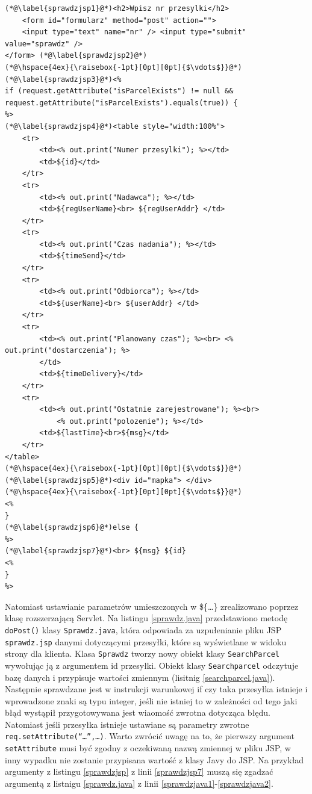 \documentclass[eng,printmode,oneside]{mgr}
\begin{document}
\begin{lstlisting}[caption=Ciało pliku JavaServlet Pages -
sprawdz.jsp,label=sprawdzjsp] 
(*@\label{sprawdzjsp1}@*)<h2>Wpisz nr przesylki</h2> 
	<form id="formularz" method="post" action=""> 
	<input type="text" name="nr" /> <input type="submit" value="sprawdz" />
</form> (*@\label{sprawdzjsp2}@*)
(*@\hspace{4ex}{\raisebox{-1pt}[0pt][0pt]{$\vdots$}}@*)
(*@\label{sprawdzjsp3}@*)<%
if (request.getAttribute("isParcelExists") != null &&
request.getAttribute("isParcelExists").equals(true)) {
%>
(*@\label{sprawdzjsp4}@*)<table style="width:100%">
	<tr>
		<td><% out.print("Numer przesylki"); %></td>
		<td>${id}</td>
	</tr>
	<tr>
		<td><% out.print("Nadawca"); %></td>
		<td>${regUserName}<br> ${regUserAddr} </td>
	</tr>
	<tr>
		<td><% out.print("Czas nadania"); %></td>
		<td>${timeSend}</td>
	</tr>
	<tr>
		<td><% out.print("Odbiorca"); %></td>
		<td>${userName}<br> ${userAddr} </td>
	</tr>
	<tr>
		<td><% out.print("Planowany czas"); %><br> <% out.print("dostarczenia"); %>
		</td>
		<td>${timeDelivery}</td>
	</tr>
	<tr>
		<td><% out.print("Ostatnie zarejestrowane"); %><br>
			<% out.print("polozenie"); %></td>
		<td>${lastTime}<br>${msg}</td>
	</tr>
</table>
(*@\hspace{4ex}{\raisebox{-1pt}[0pt][0pt]{$\vdots$}}@*)
(*@\label{sprawdzjsp5}@*)<div id="mapka"> </div>
(*@\hspace{4ex}{\raisebox{-1pt}[0pt][0pt]{$\vdots$}}@*)
<%
}
(*@\label{sprawdzjsp6}@*)else {
%>
(*@\label{sprawdzjsp7}@*)<br> ${msg} ${id}
<% 
}
%>
\end{lstlisting}

Natomiast ustawianie parametrów umieszczonych w \$\{\ldots\} zrealizowano
poprzez klasę rozszerzającą Servlet. Na listingu \ref{sprawdz.java} przedstawiono metodę
\texttt{doPost()} klasy \texttt{Sprawdz.java}, która odpowiada za uzpułenianie
pliku JSP \texttt{sprawdz.jsp} danymi dotyczącymi przesyłki, które są
wyświetlane w widoku strony dla klienta. Klasa \texttt{Sprawdz} tworzy nowy
obiekt klasy \texttt{SearchParcel} wywołując ją z argumentem id przesyłki.
Obiekt klasy \texttt{Searchparcel} odczytuje bazę danych i przypisuje
wartości zmiennym (lisitnig \ref{searchparcel.java}). Następnie sprawdzane jest
w instrukcji warunkowej if czy taka przesyłka istnieje i wprowadzone znaki są
typu integer, jeśli nie istniej to w zależności od tego jaki błąd wystąpił
przygotowywana jest wiaomość zwrotna dotycząca błędu. Natomiast jeśli przesyłka
istnieje ustawiane są parametry zwrotne
\texttt{req.setAttribute(``\ldots'',\ldots)}. Warto zwrócić uwagę na to, że
pierwszy argument \texttt{setAttribute} musi być zgodny z oczekiwaną nazwą
zmiennej w pliku JSP, w inny wypadku nie zostanie przypisana wartość z klasy
Javy do JSP. Na przykład argumenty z listingu \ref{sprawdzjsp} z linii
\ref{sprawdzjsp7} muszą się zgadzać argumentą z listnigu \ref{sprawdz.java} z
linii \ref{sprawdzjava1}-\ref{sprawdzjava2}.
\end{document}
